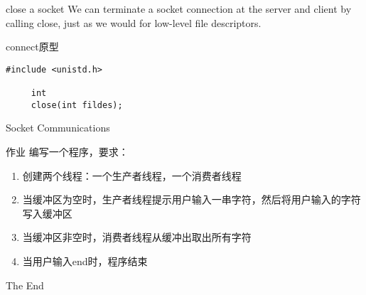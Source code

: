 \documentclass{beamer}
\begin{document}
\begin{frame}[fragile]{close a socket}
We can terminate a socket connection at the server and client by calling close, just as we would for low-level file descriptors. 
\begin{block}{connect原型}
\begin{verbatim}
#include <unistd.h>

     int
     close(int fildes);
\end{verbatim}
\end{block}
\end{frame}
\begin{frame}{Socket Communications}
\end{frame}
\begin{frame}{作业}
编写一个程序，要求：
\begin{enumerate}
\item
创建两个线程：一个生产者线程，一个消费者线程
\item
当缓冲区为空时，生产者线程提示用户输入一串字符，然后将用户输入的字符写入缓冲区
\item
当缓冲区非空时，消费者线程从缓冲出取出所有字符
\item
当用户输入end时，程序结束
\end{enumerate}
\end{frame}

\begin{frame}
\Huge{\centerline{The End}}
\end{frame}
\end{document}
